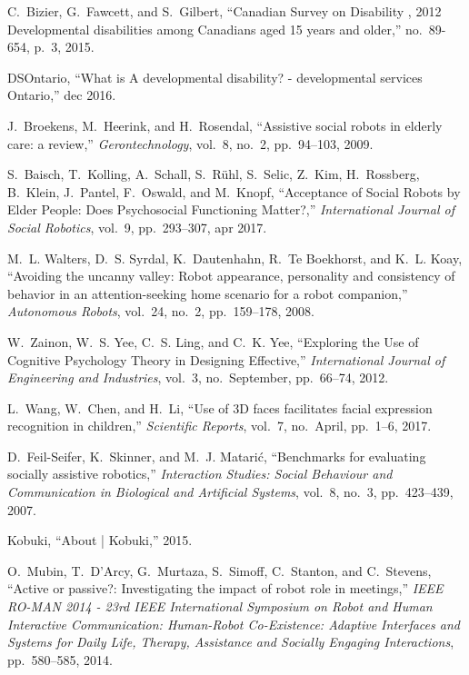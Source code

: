 \documentclass[letterpaper, 10 pt, conference]{ieeeconf}  %
\begin{document}
\begin{thebibliography}{10}

C.~Bizier, G.~Fawcett, and S.~Gilbert, ``{Canadian Survey on Disability , 2012
  Developmental disabilities among Canadians aged 15 years and older},''
  no.~89-654, p.~3, 2015.

DSOntario, ``{What is A developmental disability? - developmental services
  Ontario},'' dec 2016.

J.~Broekens, M.~Heerink, and H.~Rosendal, ``{Assistive social robots in elderly
  care: a review},'' {\em Gerontechnology}, vol.~8, no.~2, pp.~94--103, 2009.

S.~Baisch, T.~Kolling, A.~Schall, S.~R{\"{u}}hl, S.~Selic, Z.~Kim, H.~Rossberg,
  B.~Klein, J.~Pantel, F.~Oswald, and M.~Knopf, ``{Acceptance of Social Robots
  by Elder People: Does Psychosocial Functioning Matter?},'' {\em International
  Journal of Social Robotics}, vol.~9, pp.~293--307, apr 2017.

M.~L. Walters, D.~S. Syrdal, K.~Dautenhahn, R.~{Te Boekhorst}, and K.~L. Koay,
  ``{Avoiding the uncanny valley: Robot appearance, personality and consistency
  of behavior in an attention-seeking home scenario for a robot companion},''
  {\em Autonomous Robots}, vol.~24, no.~2, pp.~159--178, 2008.

W.~Zainon, W.~S. Yee, C.~S. Ling, and C.~K. Yee, ``{Exploring the Use of
  Cognitive Psychology Theory in Designing Effective},'' {\em International
  Journal of Engineering and Industries}, vol.~3, no.~September, pp.~66--74,
  2012.

L.~Wang, W.~Chen, and H.~Li, ``{Use of 3D faces facilitates facial expression
  recognition in children},'' {\em Scientific Reports}, vol.~7, no.~April,
  pp.~1--6, 2017.

D.~Feil-Seifer, K.~Skinner, and M.~J. Matari{\'{c}}, ``{Benchmarks for
  evaluating socially assistive robotics},'' {\em Interaction Studies: Social
  Behaviour and Communication in Biological and Artificial Systems}, vol.~8,
  no.~3, pp.~423--439, 2007.

Kobuki, ``{About | Kobuki},'' 2015.

O.~Mubin, T.~D'Arcy, G.~Murtaza, S.~Simoff, C.~Stanton, and C.~Stevens,
  ``{Active or passive?: Investigating the impact of robot role in meetings},''
  {\em IEEE RO-MAN 2014 - 23rd IEEE International Symposium on Robot and Human
  Interactive Communication: Human-Robot Co-Existence: Adaptive Interfaces and
  Systems for Daily Life, Therapy, Assistance and Socially Engaging
  Interactions}, pp.~580--585, 2014.


\end{thebibliography}
\end{document}
